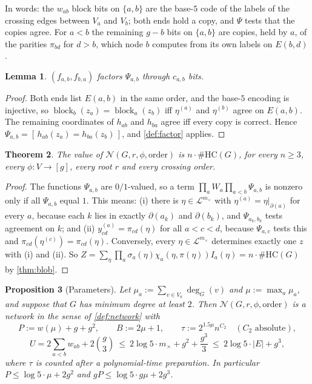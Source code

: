 \documentclass[11pt]{amsart}
\theoremstyle{plain}
\newtheorem{theorem}{Theorem}[section]
\newtheorem{lemma}[theorem]{Lemma}
\newtheorem{proposition}[theorem]{Proposition}
\theoremstyle{definition}
\theoremstyle{remark}
\numberwithin{equation}{section}
\newcommand{\HC}{\#\mathrm{HC}}
\newcommand{\cL}{\mathcal{L}}
\newcommand{\mx}{m_{\times}}
\newcommand{\block}{\operatorname{block}}
\newcommand{\Ind}[1]{[\,#1\,]}
\begin{document}
In words: the $w_{ab}$ block bits on $\{a,b\}$ are the base-$5$ code of the labels of the crossing
edges between $V_a$ and $V_b$; both ends hold a copy, and $\Psi$ tests that the copies agree. For
$a<b$ the remaining $g-b$ bits on $\{a,b\}$ are copies, held by $a$, of the parities $\pi_{bd}$
for $d>b$, which node $b$ computes from its own labels on $E(b,d)$.

\begin{lemma}\label{lem:factorisation}
$(f_{a,b},f_{b,a})$ factors $\Psi_{a,b}$ through $c_{a,b}$ bits.
\end{lemma}

\begin{proof}
Both ends list $E(a,b)$ in the same order, and the base-$5$ encoding is injective, so
$\block_b(z_a)=\block_a(z_b)$ iff $\eta^{(a)}$ and $\eta^{(b)}$ agree on $E(a,b)$. The remaining
coordinates of $h_{ab}$ and $h_{ba}$ agree iff every copy is correct. Hence
$\Psi_{a,b}=\Ind{h_{ab}(z_a)=h_{ba}(z_b)}$, and \cref{def:factor} applies.
\end{proof}

\begin{theorem}\label{thm:network-value}
The value of $\mathcal N(G,r,\phi,\text{order})$ is $n\cdot\HC(G)$, for every $n\ge3$, every
$\phi\colon V\to[g]$, every root $r$ and every crossing order.
\end{theorem}

\begin{proof}
The functions $\Psi_{a,b}$ are $0/1$-valued, so a term $\prod_aW_a\prod_{a<b}\Psi_{a,b}$ is
nonzero only if all $\Psi_{a,b}$ equal $1$. This means: (i) there is $\eta\in\cL^{\mx}$ with
$\eta^{(a)}=\eta|_{\partial(a)}$ for every $a$, because each $k$ lies in exactly $\partial(a_k)$
and $\partial(b_k)$, and $\Psi_{a_k,b_k}$ tests agreement on $k$; and (ii)
$y^{(a)}_{cd}=\pi_{cd}(\eta)$ for all $a<c<d$, because $\Psi_{a,c}$ tests this and
$\pi_{cd}(\eta^{(c)})=\pi_{cd}(\eta)$. Conversely, every $\eta\in\cL^{\mx}$ determines exactly one
$z$ with (i) and (ii). So $Z=\sum_\eta\prod_a\sigma_a(\eta)\chi_a(\eta,\pi(\eta))I_a(\eta)=
n\cdot\HC(G)$ by \cref{thm:blob}.
\end{proof}

\begin{proposition}[Parameters]\label{prop:parameters}
Let $\mu_a:=\sum_{v\in V_a}\deg_G(v)$ and $\mu:=\max_a\mu_a$, and suppose that $G$ has minimum
degree at least $2$. Then $\mathcal N(G,r,\phi,\text{order})$ is a network in the sense of
\cref{def:network} with
\[
  P:=w(\mu)+g+g^2,\qquad B:=2\mu+1,\qquad \tau:=2^{1.5\mu}n^{C_2}\quad(C_2\text{ absolute}),
\]
\[
  U=2\sum_{a<b}w_{ab}+2\binom g3\ \le\ 2\log5\cdot\mx+g^2+\frac{g^3}{3}\ \le\ 2\log5\cdot|E|+g^3,
\]
where $\tau$ is counted after a polynomial-time preparation. In particular $P\le\log5\cdot\mu+2g^2$
and $gP\le\log5\cdot g\mu+2g^3$.
\end{proposition}
\end{document}
